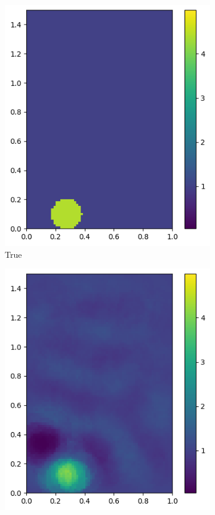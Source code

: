\documentclass[12pt]{article}
\newcommand{\nhghaloesheight}{3.2cm}
\newcommand{\nhghaloeswidth}{2.6cm}
\begin{document}
\begin{figure}[h]
  \centering
  \begin{subfigure}[c]{\nhghaloeswidth}
    \includegraphics[totalheight=\nhghaloesheight]{Figures/softplus_halos/ex1/mutrue.png}
    \caption{\label{fig:haloes_true} True}
  \end{subfigure}
  \begin{subfigure}[c]{\nhghaloeswidth}
    \includegraphics[totalheight=\nhghaloesheight]{Figures/softplus_halos/ex1/musoftplus.png}

\end{subfigure}
\end{figure}
\end{document}
